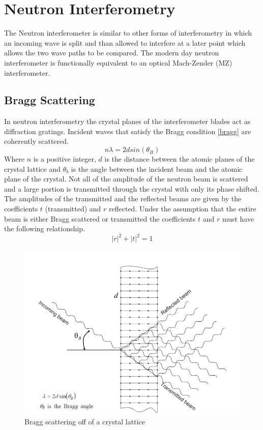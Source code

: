 \section{Neutron Interferometry}
The Neutron interferometer is similar to other forms of interferometry in which an incoming wave is split and than allowed to interfere at a later point which allows the two wave paths to be compared. The modern day neutron interferometer is functionally equivalent to an optical Mach-Zender (MZ) interferometer.\cite{machzehnder}

\subsection{Bragg Scattering}
In neutron interferometry the crystal planes of the interferometer blades act as diffraction gratings. Incident waves that satisfy the Bragg condition \ref{bragg} are coherently scattered.
\begin{equation}
\label{bragg}
n\lambda = 2d sin(\theta_{B})
\end{equation} 
Where $n$ is a positive integer, $d$ is the distance between the atomic planes of the crystal lattice and $\theta_{b}$ is the angle between the incident beam and the atomic plane of the crystal. Not all of the amplitude of the neutron beam is scattered and a large portion is transmitted through the crystal with only its phase shifted. The amplitudes of the transmitted and the reflected beams are given by the coefficients $t$ (transmitted) and $r$ reflected. Under the assumption that the entire beam is either Bragg scattered or transmitted the coefficients $t$ and $r$ must have the following relationship.\cite{dimaThesis}  
\begin{equation}
|r|^2+|t|^2 = 1
\label{eq:BraggCoefficents}
\end{equation}

\begin{figure}[ht!]
\centering
\includegraphics[scale=0.5]{Figures/braggscattering.png}
\caption{Bragg scattering off of a crystal lattice}
\label{fig:braggscattering}
\end{figure}

